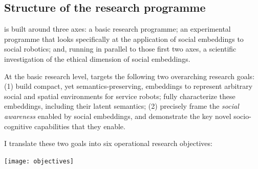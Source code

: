 \subsection{Structure of the research programme}

\project is built around three axes: a basic research programme; an experimental
programme that looks specifically at the application of social embeddings to
social robotics; and, running in parallel to those first two axes, a scientific
investigation of the ethical dimension of social embeddings.

At the basic research level, \project targets the following
two overarching research goals: (1) build compact, yet semantics-preserving,
embeddings to represent arbitrary social and spatial environments for service
robots; fully characterize these embeddings, including their latent semantics;
(2) precisely frame the \emph{social awareness} enabled by social embeddings,
and demonstrate the key novel socio-cognitive capabilities that they enable.

I translate these two goals into six operational research objectives:

\begin{center}
    \texttt{[image: objectives]}
\end{center}

